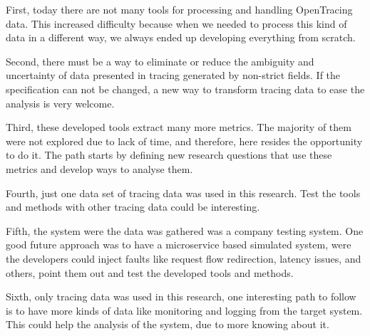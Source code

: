 First, today there are not many tools for processing and handling OpenTracing data. This increased difficulty because when we needed to process this kind of data in a different way, we always ended up developing everything from scratch.

Second, there must be a way to eliminate or reduce the ambiguity and uncertainty of data presented in tracing generated by non-strict fields. If the specification can not be changed, a new way to transform tracing data to ease the analysis is very welcome.

Third, these developed tools extract many more metrics. The majority of them were not explored due to lack of time, and therefore, here resides the opportunity to do it. The path starts by defining new research questions that use these metrics and develop ways to analyse them.

Fourth, just one data set of tracing data was used in this research. Test the tools and methods with other tracing data could be interesting.

Fifth, the system were the data was gathered was a company testing system. One good future approach was to have a microservice based simulated system, were the developers could inject faults like request flow redirection, latency issues, and others, point them out and test the developed tools and methods.

Sixth, only tracing data was used in this research, one interesting path to follow is to have more kinds of data like monitoring and logging from the target system. This could help the analysis of the system, due to more knowing about it.


%
%
%
%
%
%
%
%
%

\checkoddpage
{}
{ %
\newpage
\blankpage}
{ %
}